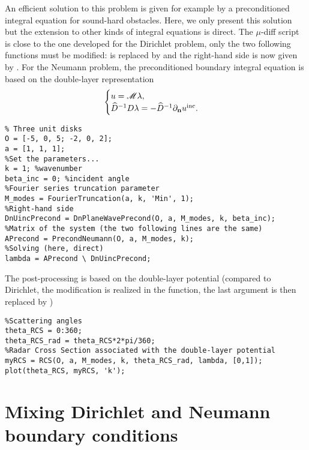 An efficient solution to this problem is given for example by a preconditioned integral equation for sound-hard obstacles.
Here, we only present this solution but the extension to other kinds of integral equations is direct.
 The $\mu$-diff script is close to the one developed for the Dirichlet problem, only the two following functions must
  be modified: \PrecondDirichlet is replaced by \PrecondNeumann and the right-hand side \PlaneWavePrecond is now given by
   \DnPlaneWavePrecond. For the Neumann problem, the preconditioned boundary integral equation is based on the double-layer representation
$$
\begin{cases}
u = {\mathscr M}\lambda,\\
\widehat{D}^{-1} D \lambda = -\widehat{D}^{-1}\partial_{\mathbf{n}}u^{\textrm{inc}}.
\end{cases}
$$
\begin{lstlisting}
% Three unit disks 
O = [-5, 0, 5; -2, 0, 2];
a = [1, 1, 1];
%Set the parameters...
k = 1; %wavenumber
beta_inc = 0; %incident angle
%Fourier series truncation parameter
M_modes = FourierTruncation(a, k, 'Min', 1);
%Right-hand side
DnUincPrecond = DnPlaneWavePrecond(O, a, M_modes, k, beta_inc);
%Matrix of the system (the two following lines are the same)
APrecond = PrecondNeumann(O, a, M_modes, k);
%Solving (here, direct)
lambda = APrecond \ DnUincPrecond;
\end{lstlisting}
\medskip

The post-processing is based on the double-layer potential (compared to Dirichlet, the modification is realized in the \RCS function, the
 last argument \code{[1,0]} is then replaced by  \code{[0,1]})
\begin{lstlisting}
%Scattering angles
theta_RCS = 0:360;
theta_RCS_rad = theta_RCS*2*pi/360;
%Radar Cross Section associated with the double-layer potential
myRCS = RCS(O, a, M_modes, k, theta_RCS_rad, lambda, [0,1]);
plot(theta_RCS, myRCS, 'k');
\end{lstlisting}
\medskip

\section{Mixing Dirichlet and Neumann boundary conditions}

